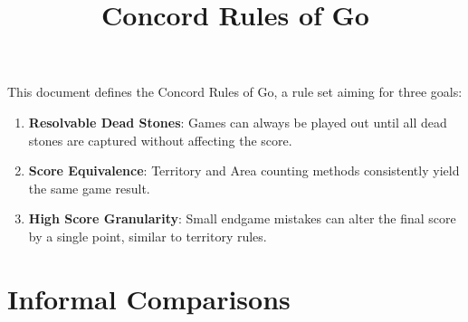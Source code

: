 \documentclass[11pt]{article}
\title{Concord Rules of Go}
\author{}
\date{}
\begin{document}
\maketitle

This document defines the Concord Rules of Go, a rule set aiming for three goals:

\begin{enumerate}
\item \textbf{Resolvable Dead Stones}: Games can always be played out until all dead stones are captured without affecting the score.
\item \textbf{Score Equivalence}: Territory and Area counting methods consistently yield the same game result.
\item \textbf{High Score Granularity}: Small endgame mistakes can alter the final score by a single point, similar to territory rules.
\end{enumerate}

\section{Informal Comparisons}
\end{document}
